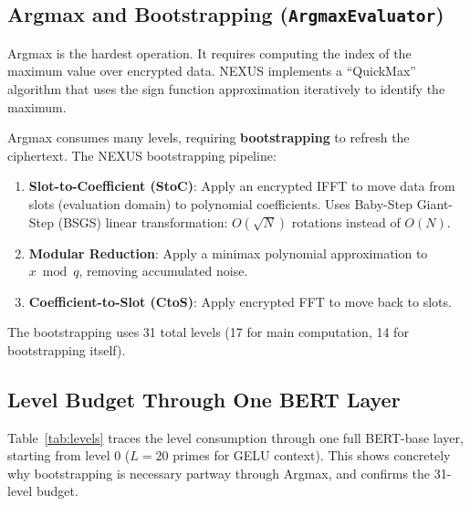 \documentclass[11pt,letterpaper]{article}
\begin{document}
\subsection{Argmax and Bootstrapping (\texttt{ArgmaxEvaluator})}

Argmax is the hardest operation. It requires computing the index of the maximum value over
encrypted data. NEXUS implements a ``QuickMax'' algorithm that uses the sign function
approximation iteratively to identify the maximum.

Argmax consumes many levels, requiring \textbf{bootstrapping} to refresh the ciphertext.
The NEXUS bootstrapping pipeline:

\begin{enumerate}
  \item \textbf{Slot-to-Coefficient (StoC)}: Apply an encrypted IFFT to move data from
    slots (evaluation domain) to polynomial coefficients. Uses Baby-Step Giant-Step (BSGS)
    linear transformation: $O(\sqrt{N})$ rotations instead of $O(N)$.
  \item \textbf{Modular Reduction}: Apply a minimax polynomial approximation to
    $x \bmod q$, removing accumulated noise.
  \item \textbf{Coefficient-to-Slot (CtoS)}: Apply encrypted FFT to move back to slots.
\end{enumerate}

The bootstrapping uses 31 total levels (17 for main computation, 14 for bootstrapping itself).

\subsection{Level Budget Through One BERT Layer}
\label{sec:levelbudget}

Table~\ref{tab:levels} traces the level consumption through one full BERT-base layer,
starting from level 0 ($L=20$ primes for GELU context). This shows concretely why
bootstrapping is necessary partway through Argmax, and confirms the 31-level budget.
\end{document}
